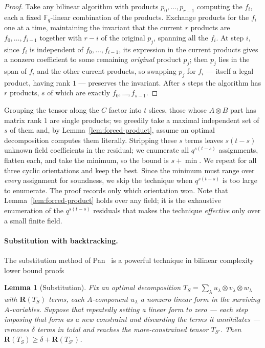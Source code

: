 \documentclass[11pt]{article}
\newtheorem{lemma}{Lemma}
\theoremstyle{definition}
\newcommand{\F}{\mathbb{F}}
\newcommand{\R}{\mathbf{R}}
\begin{document}
\begin{proof}
  Take any bilinear algorithm with products $p_0,\dots,p_{r-1}$ computing the $f_i$,
  each a fixed $\F_q$-linear combination of the products. Exchange products for the
  $f_i$ one at a time, maintaining the invariant that the current $r$ products are
  $f_0,\dots,f_{i-1}$ together with $r-i$ of the original $p_j$, spanning all the
  $f_i$. At step $i$, since $f_i$ is independent of $f_0,\dots,f_{i-1}$, its
  expression in the current products gives a nonzero coefficient to some remaining
  \emph{original} product $p_j$; then $p_j$ lies in the span of $f_i$ and the other
  current products, so swapping $p_j$ for $f_i$ --- itself a legal product, having
  rank $1$ --- preserves the invariant. After $s$ steps the algorithm has $r$
  products, $s$ of which are exactly $f_0,\dots,f_{s-1}$.
\end{proof}

Grouping the tensor along the $C$ factor into $t$ slices, those whose $A\otimes B$
part has matrix rank $1$ are single products; we greedily take a maximal independent
set of $s$ of them and, by Lemma~\ref{lem:forced-product}, assume an optimal
decomposition computes them literally. Stripping these $s$ terms leaves $s(t-s)$
unknown field coefficients in the residual; we enumerate all $q^{s(t-s)}$
assignments, flatten each, and take the minimum, so the bound is $s+\min$. We repeat
for all three cyclic orientations and keep the best. Since the minimum must range
over \emph{every} assignment for soundness, we skip the technique when $q^{s(t-s)}$ is
too large to enumerate. The proof records only which orientation won. Note that
Lemma~\ref{lem:forced-product} holds over any field; it is the exhaustive enumeration
of the $q^{s(t-s)}$ residuals that makes the technique \emph{effective} only over a
small finite field.

\paragraph{Substitution with backtracking.} The substitution method of Pan~\cite{pan1966methods}
is a powerful technique in bilinear complexity lower bound proofs

\begin{lemma}[Substitution]\label{lem:substitution}
  Fix an optimal decomposition $T_S=\sum_{\lambda}u_\lambda\otimes v_\lambda\otimes
  w_\lambda$ with $\R(T_S)$ terms, each $A$-component $u_\lambda$ a nonzero linear form
  in the surviving $A$-variables. Suppose that repeatedly setting a linear form to zero
  --- each step imposing that form as a new constraint and discarding the terms it
  annihilates --- removes $\delta$ terms in total and reaches the more-constrained
  tensor $T_{S'}$. Then $\R(T_S)\ge\delta+\R(T_{S'})$.
\end{lemma}
\end{document}
